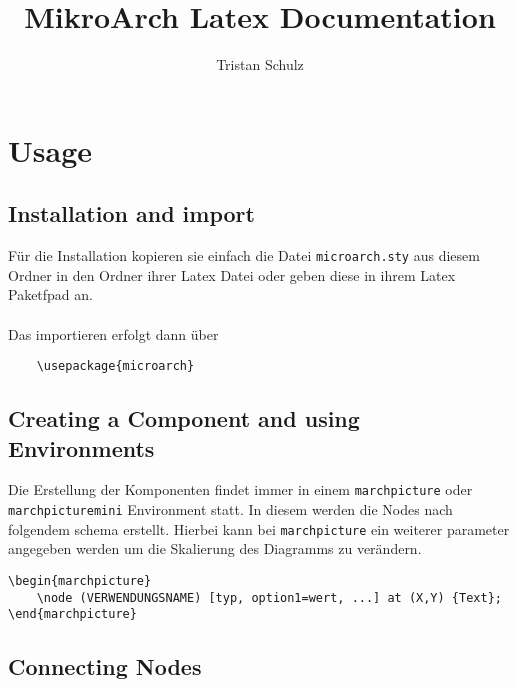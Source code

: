 \documentclass[
	ngerman,
	accentcolor=9c,%
	type=intern,
	marginpar=false
	]{article}
\begin{document}
\title{MikroArch Latex Documentation}
\author{Tristan Schulz}

\maketitle

\tableofcontents

\section{Usage}

\subsection{Installation and import}

Für die Installation kopieren sie einfach die Datei \lstinline|microarch.sty| aus diesem Ordner in den Ordner ihrer Latex Datei oder geben diese in ihrem Latex Paketfpad an.
\\\\
Das importieren erfolgt dann über
\begin{lstlisting}
	\usepackage{microarch}
\end{lstlisting}

\subsection{Creating a Component and using Environments}

Die Erstellung der Komponenten findet immer in einem \lstinline|marchpicture| oder \lstinline|marchpicturemini| Environment statt. In diesem werden die Nodes nach folgendem schema erstellt. Hierbei kann bei \lstinline|marchpicture| ein weiterer parameter angegeben werden um die Skalierung des Diagramms zu verändern.
\begin{lstlisting}
\begin{marchpicture}
	\node (VERWENDUNGSNAME) [typ, option1=wert, ...] at (X,Y) {Text};
\end{marchpicture}
\end{lstlisting}




\subsection{Connecting Nodes}
\end{document}
